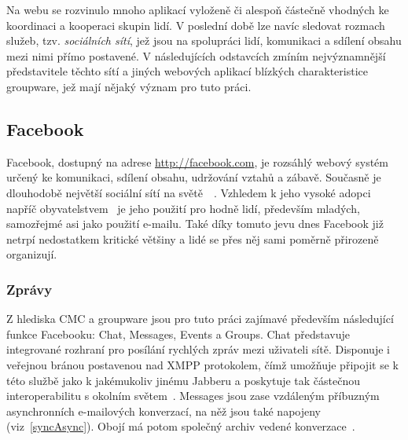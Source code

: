 \documentclass[12pt,oneside,final]{fithesis2}
\begin{document}
Na webu se rozvinulo mnoho aplikací vyloženě či alespoň částečně vhodných ke koordinaci a kooperaci skupin lidí. V poslední době lze navíc sledovat rozmach služeb, tzv. \emph{sociálních sítí}, jež jsou na spolupráci lidí, komunikaci a sdílení obsahu mezi nimi přímo postavené. V následujících odstavcích zmíním nejvýznamnější představitele těchto sítí a jiných webových aplikací blízkých charakteristice groupware, jež mají nějaký význam pro tuto práci.

\subsection{Facebook}\label{facebook}
Facebook, dostupný na adrese \url{http://facebook.com}, je rozsáhlý webový systém určený ke komunikaci, sdílení obsahu, udržování vztahů a zábavě. Současně je dlouhodobě největší sociální sítí na světě~\cite{kazeniac2009social}~\cite{protalinski2012facebook}. Vzhledem k jeho vysoké adopci napříč obyvatelstvem~\cite{docekal2011socialni} je jeho použití pro hodně lidí, především mladých, samozřejmé asi jako použití e-mailu. Také díky tomuto jevu dnes Facebook již netrpí nedostatkem kritické většiny a lidé se přes něj sami poměrně přirozeně organizují.

\subsubsection*{Zprávy}
Z hlediska CMC a groupware jsou pro tuto práci zajímavé především následující funkce Facebooku: Chat, Messages, Events a Groups. Chat představuje integrované rozhraní pro posílání rychlých zpráv mezi uživateli sítě. Disponuje i veřejnou bránou postavenou nad XMPP protokolem, čímž umožňuje připojit se k této službě jako k jakémukoliv jinému Jabberu a poskytuje tak částečnou interoperabilitu s okolním světem~\cite{reiss2010facebook}. Messages jsou zase vzdáleným příbuzným asynchronních e-mailových konverzací, na něž jsou také napojeny (viz~\ref{syncAsync}). Obojí má potom společný archiv vedené konverzace~\cite{seligstein2010see}.
\end{document}
